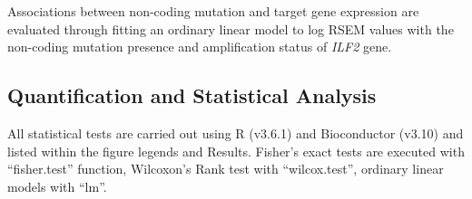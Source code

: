 \documentclass[phd,tocprelim]{cornell}
\begin{document}
Associations between non-coding mutation and target gene expression are evaluated through fitting an ordinary linear model to log RSEM values with the non-coding mutation presence and amplification status of \textit{ILF2} gene.

\subsection*{Quantification and Statistical Analysis}
All statistical tests are carried out using R (v3.6.1) and Bioconductor (v3.10) and listed within the figure legends and Results. Fisher’s exact tests are executed with “fisher.test” function, Wilcoxon’s Rank test with “wilcox.test”, ordinary linear models with “lm”.


\end{document}

